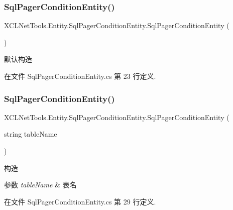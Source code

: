 \subsubsection{\texorpdfstring{Sql\+Pager\+Condition\+Entity()}{SqlPagerConditionEntity()}\hspace{0.1cm}{\footnotesize\ttfamily [1/2]}}
{\footnotesize\ttfamily X\+C\+L\+Net\+Tools.\+Entity.\+Sql\+Pager\+Condition\+Entity.\+Sql\+Pager\+Condition\+Entity (\begin{DoxyParamCaption}{ }\end{DoxyParamCaption})}



默认构造 



在文件 Sql\+Pager\+Condition\+Entity.\+cs 第 23 行定义.

\mbox{\label{class_x_c_l_net_tools_1_1_entity_1_1_sql_pager_condition_entity_a567e636eb71d4281f260cad017707cc9}} 
\subsubsection{\texorpdfstring{Sql\+Pager\+Condition\+Entity()}{SqlPagerConditionEntity()}\hspace{0.1cm}{\footnotesize\ttfamily [2/2]}}
{\footnotesize\ttfamily X\+C\+L\+Net\+Tools.\+Entity.\+Sql\+Pager\+Condition\+Entity.\+Sql\+Pager\+Condition\+Entity (\begin{DoxyParamCaption}\item[{string}]{table\+Name }\end{DoxyParamCaption})}



构造 


\begin{DoxyParams}{参数}
{\em table\+Name} & 表名\\
\hline
\end{DoxyParams}


在文件 Sql\+Pager\+Condition\+Entity.\+cs 第 29 行定义.




